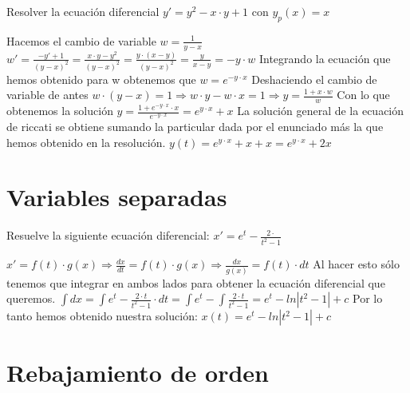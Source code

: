 \begin{ejer}
	Resolver la ecuación diferencial $y' = y^2 - x\cdot y + 1$ con $y_p(x) =x$
\end{ejer}
\begin{sol}
	Hacemos el cambio de variable $w = \frac{1}{y-x}$  
	$w' = \frac{-y' + 1}{(y-x)^2} = \frac{x\cdot y - y^2}{(y-x)^2} = \frac{y\cdot (x-y)}{(y-x)^2} = \frac{y}{x-y} = -y\cdot w$  
	Integrando la ecuación que hemos obtenido para w obtenemos que $w = e^{-y\cdot x}$  
	Deshaciendo el cambio de variable de antes
	$w\cdot (y-x) = 1 \Rightarrow w\cdot y - w\cdot x = 1 \Rightarrow y = \frac{1+x\cdot w}{w}$  
	Con lo que obtenemos la solución $y = \frac{1+e^{-y\cdot x}\cdot x}{e^{-y\cdot x}} = e^{y\cdot x} + x$  
	La solución general de la ecuación de riccati se obtiene sumando la particular dada por el enunciado más la que hemos obtenido en la resolución.  
	$y(t) = e^{y\cdot x} + x + x = e^{y\cdot x} + 2x$
\end{sol}


\section{Variables separadas}

\begin{ejer}
	Resuelve la siguiente ecuación diferencial:  
	$x' = e^t - \frac{2\cdot}{t^2-1}$ 
\end{ejer}
\begin{sol}
	$x' = f(t)\cdot g(x) \Rightarrow \frac{dx}{dt} = f(t)\cdot g(x) \Rightarrow \frac{dx}{g(x)} = f(t)\cdot dt$  
	Al hacer esto sólo tenemos que integrar en ambos lados para obtener la ecuación diferencial que queremos.  
	$\int dx = \int e^t - \frac{2\cdot t}{t^2-1}\cdot dt = \int e^t - \int \frac{2\cdot t}{t^2-1} = e^t - ln|t^2-1| + c$  
	Por lo tanto hemos obtenido nuestra solución:  
	$x(t) = e^t - ln|t^2-1| + c$
\end{sol}


\section{Rebajamiento de orden}

